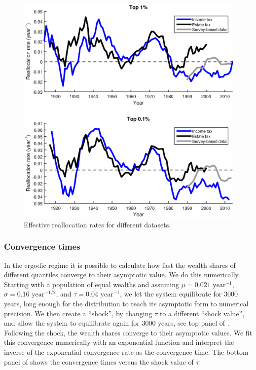 \begin{figure}[!htb]
\centering
\includegraphics[width=1.0\textwidth] {./chapter_3/figs/tau_top1_top0i1_datasets.eps}
\caption{Effective reallocation rates for different datasets.}
\end{figure}

\subsubsection{Convergence times}

In the ergodic regime it is possible to calculate how fast the wealth shares of different quantiles converge to their asymptotic value. We do this numerically. Starting with a population of equal wealths and assuming $\mu=0.021 \text{ year}^{-1}$, $\sigma=0.16 \text{ year}^{-1/2}$, and $\tau = 0.04\text{ year}^{-1}$, we let the system equilibrate for 3000 years, long enough for the distribution to reach its asymptotic form to numerical precision. We then create a ``shock'', by changing $\tau$ to a different ``shock value'', and allow the system to equilibrate again for 3000 years, see top panel of . Following the shock, the wealth shares converge to their asymptotic values. We fit this convergence numerically with an exponential function and interpret the inverse of the exponential convergence rate as the convergence time. The bottom panel of   shows the convergence times versus the shock value of $\tau$.

